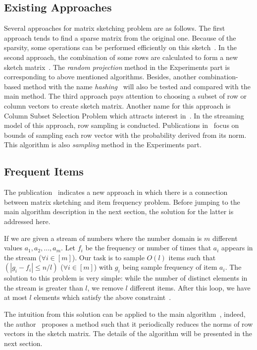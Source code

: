 \documentclass{acm_proc_article-sp}
\begin{document}
\subsection{Existing Approaches}

Several approaches for matrix sketching problem are as follows. The first approach tends to find a sparse matrix from the original one. Because of the sparsity, some operations can be performed efficiently on this sketch~\cite{ref2, ref3, ref14}. In the second approach, the combination of some rows are calculated to form a new sketch matrix~\cite{ref4, ref5, ref15, ref16}. The \textit{random projection} method in the Experiments part is corresponding to above mentioned algorithms. Besides, another combination-based method with the name \textit{hashing}~\cite{ref6} will also be tested and compared with the main method. The third approach pays attention to choosing a subset of row or column vectors to create sketch matrix. Another name for this approach is Column Subset Selection Problem which attracts interest in~\cite{ref7, ref8, ref9, ref10, ref11}. In the streaming model of this approach, row sampling is conducted. Publications in~\cite{ref11, ref7, ref12, ref13, ref17} focus on bounds of sampling each row vector with the probability derived from its norm. This algorithm is also \textit{sampling} method in the Experiments part.

\subsection{Frequent Items}

The publication~\cite{ref1} indicates a new approach in which there is a connection between matrix sketching and item frequency problem. Before jumping to the main algorithm description in the next section, the solution for the latter is addressed here.

If we are given a stream of numbers where the number domain is $m$ different values $a_{1}, a_{2}, ..., a_{m}$. Let $f_{i}$ be the frequency or number of times that $a_{i}$ appears in the stream ($\forall i \in [m]$). Our task is to sample $O(l)$ items such that $(|g_{i} - f_{i}| \leq n/l)$ ($\forall i \in [m]$) with $g_{i}$ being sample frequency of item $a_{i}$. The solution to this problem is very simple: while the number of distinct elements in the stream is greater than $l$, we remove $l$ different items. After this loop, we have at most $l$ elements which satisfy the above constraint~\cite{ref1}.

The intuition from this solution can be applied to the main algorithm~\cite{ref1}, indeed, the author~\cite{ref1} proposes a method such that it periodically reduces the norms of row vectors in the sketch matrix. The details of the algorithm will be presented in the next section.
\end{document}

